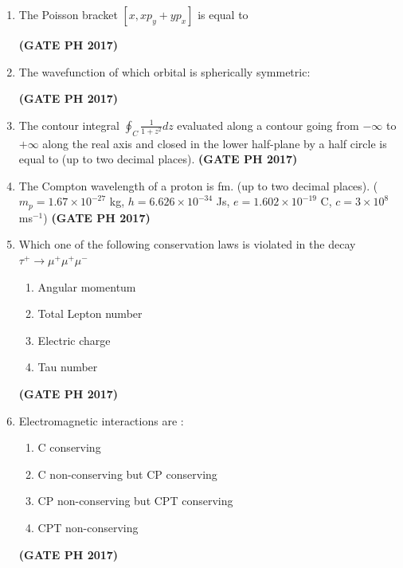\documentclass[14pt, a4paper]{extarticle}
\begin{document}
\begin{enumerate}[label=\textbf{Q.\arabic*}]
\item The Poisson bracket $[x, x p_y + y p_x]$ is equal to
\begin{enumerate}
\end{enumerate}
\hfill \textbf{(GATE PH 2017)}

\item The wavefunction of which orbital is spherically symmetric:
\begin{enumerate}
\end{enumerate}
\hfill \textbf{(GATE PH 2017)}

\item The contour integral $\oint_C \frac{1}{1+z^2} dz$ evaluated along a contour going from $-\infty$ to $+\infty$ along the real axis and closed in the lower half-plane by a half circle is equal to \underline{\hspace{3cm}} (up to two decimal places).
\hfill \textbf{(GATE PH 2017)}

\item The Compton wavelength of a proton is \underline{\hspace{3cm}} fm. (up to two decimal places). ($m_p=1.67\times10^{-27}$ kg, $h=6.626\times10^{-34}$ Js, $e=1.602\times10^{-19}$ C, $c=3\times10^8$ ms$^{-1}$)
\hfill \textbf{(GATE PH 2017)}

\item Which one of the following conservation laws is violated in the decay $\tau^+ \to \mu^+ \mu^+ \mu^-$
\begin{enumerate}
\item Angular momentum
\item Total Lepton number
\item Electric charge
\item Tau number
\end{enumerate}
\hfill \textbf{(GATE PH 2017)}

\item Electromagnetic interactions are :
\begin{enumerate}
\item C conserving
\item C non-conserving but CP conserving
\item CP non-conserving but CPT conserving
\item CPT non-conserving
\end{enumerate}
\hfill \textbf{(GATE PH 2017)}


\end{enumerate}
\end{document}
